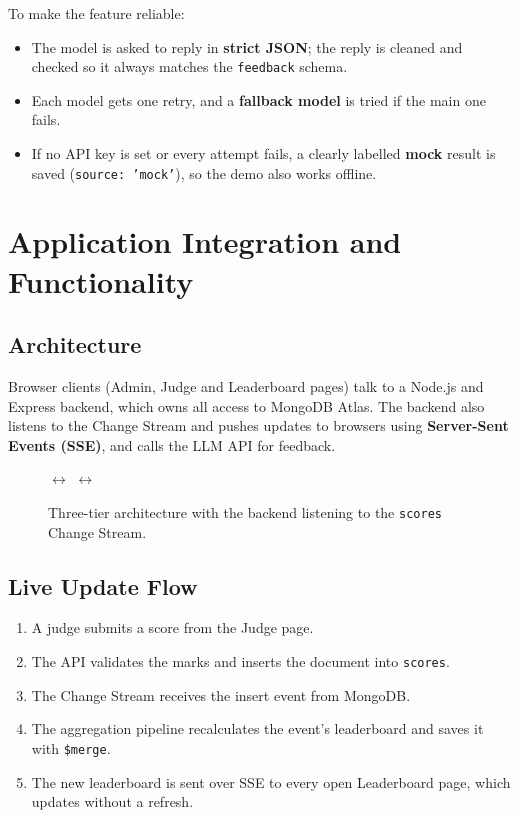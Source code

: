 \documentclass[11pt,a4paper]{article}
\begin{document}
To make the feature reliable:
\begin{itemize}
  \item The model is asked to reply in \textbf{strict JSON}; the reply is cleaned and checked so it always matches the \texttt{feedback} schema.
  \item Each model gets one retry, and a \textbf{fallback model} is tried if the main one fails.
  \item If no API key is set or every attempt fails, a clearly labelled \textbf{mock} result is saved (\texttt{source: 'mock'}), so the demo also works offline.
\end{itemize}

\section{Application Integration and Functionality}

\subsection{Architecture}
Browser clients (Admin, Judge and Leaderboard pages) talk to a Node.js and Express backend, which owns all access to MongoDB Atlas. The backend also listens to the Change Stream and pushes updates to browsers using \textbf{Server-Sent Events (SSE)}, and calls the LLM API for feedback.

\begin{figure}[H]
\centering
{}
\;$\longleftrightarrow$\;
\;$\longleftrightarrow$\;
\caption{Three-tier architecture with the backend listening to the \texttt{scores} Change Stream.}
\end{figure}

\subsection{Live Update Flow}
\begin{enumerate}
  \item A judge submits a score from the Judge page.
  \item The API validates the marks and inserts the document into \texttt{scores}.
  \item The Change Stream receives the insert event from MongoDB.
  \item The aggregation pipeline recalculates the event's leaderboard and saves it with \texttt{\$merge}.
  \item The new leaderboard is sent over SSE to every open Leaderboard page, which updates without a refresh.
\end{enumerate}
\end{document}
